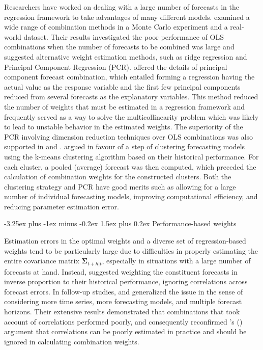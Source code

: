 \documentclass[11pt]{article}
\makeatletter
\def\citeapos#1{\citeauthor{#1}'s (\citeyear{#1})}
\renewcommand{\paragraph}{\@startsection{paragraph}{4}{0ex}%
   {-3.25ex plus -1ex minus -0.2ex}%
   {1.5ex plus 0.2ex}%
   {\normalfont\normalsize\bfseries}}
\makeatother
\begin{document}
Researchers have worked on dealing with a large number of forecasts in the regression framework to take advantages of many different models. \cite{Chan1999-io} examined a wide range of combination methods in a Monte Carlo experiment and a real-world dataset. Their results investigated the poor performance of OLS combinations when the number of forecasts to be combined was large and suggested alternative weight estimation methods, such as ridge regression and Principal Component Regression (PCR). \cite{Stock2004-rq} offered the details of principal component forecast combination, which entailed forming a regression having the actual value as the response variable and the first few principal components reduced from several forecasts as the explanatory variables. This method reduced the number of weights that must be estimated in a regression framework and frequently served as a way to solve the multicollinearity problem which was likely to lead to unstable behavior in the estimated weights. The superiority of the PCR involving dimension reduction techniques over OLS combinations was also supported in \cite{Rapach2008-jh} and \cite{Poncela2011-vz}. \cite{Aiolfi2006-rh} argued in favour of a step of clustering forecasting models using the k-means clustering algorithm based on their historical performance. For each cluster, a pooled (average) forecast was then computed, which preceded the calculation of combination weights for the constructed clusters. Both the clustering strategy and PCR have good merits such as allowing for a large number of individual forecasting models, improving computational efficiency, and reducing parameter estimation error.

\paragraph{Performance-based weights}

Estimation errors in the optimal weights and a diverse set of regression-based weights tend to be particularly large due to difficulties in properly estimating the entire covariance matrix $\boldsymbol{\Sigma}_{t+h|t}$, especially in situations with a large number of forecasts at hand. Instead, \cite{Bates1969-yj} suggested weighting the constituent forecasts in inverse proportion to their historical performance, ignoring correlations across forecast errors. In follow-up studies, \cite{Newbold1974-lp} and \cite{Winkler1983-ra} generalized the issue in the sense of considering more time series, more forecasting models, and multiple forecast horizons. Their extensive results demonstrated that combinations that took account of correlations performed poorly, and consequently reconfirmed \citeapos{Bates1969-yj} argument that correlations can be poorly estimated in practice and should be ignored in calculating combination weights.
\end{document}
